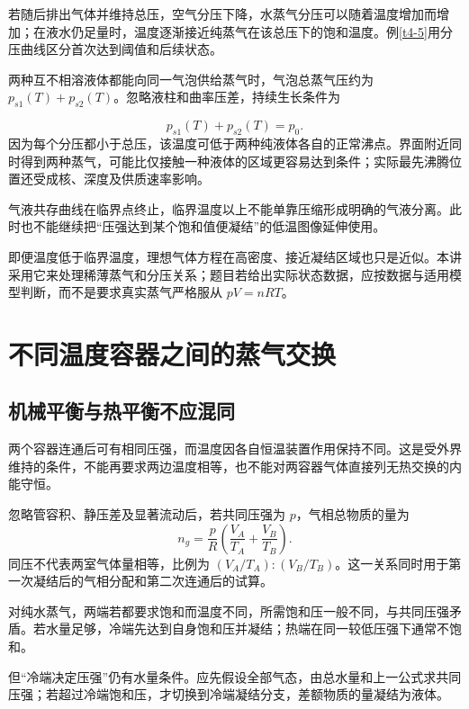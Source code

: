 若随后排出气体并维持总压，空气分压下降，水蒸气分压可以随着温度增加而增加；在液水仍足量时，温度逐渐接近纯蒸气在该总压下的饱和温度。例\ref{t4-5}用分压曲线区分首次达到阈值和后续状态。

两种互不相溶液体都能向同一气泡供给蒸气时，气泡总蒸气压约为 $p_{s1}(T)+p_{s2}(T)$。忽略液柱和曲率压差，持续生长条件为

\[p_{s1}(T)+p_{s2}(T)=p_0.
\]
因为每个分压都小于总压，该温度可低于两种纯液体各自的正常沸点。界面附近同时得到两种蒸气，可能比仅接触一种液体的区域更容易达到条件；实际最先沸腾位置还受成核、深度及供质速率影响。


气液共存曲线在临界点终止，临界温度以上不能单靠压缩形成明确的气液分离。此时也不能继续把“压强达到某个饱和值便凝结”的低温图像延伸使用。

即便温度低于临界温度，理想气体方程在高密度、接近凝结区域也只是近似。本讲采用它来处理稀薄蒸气和分压关系；题目若给出实际状态数据，应按数据与适用模型判断，而不是要求真实蒸气严格服从 $pV=nRT$。

\section{不同温度容器之间的蒸气交换}
\subsection{机械平衡与热平衡不应混同}
两个容器连通后可有相同压强，而温度因各自恒温装置作用保持不同。这是受外界维持的条件，不能再要求两边温度相等，也不能对两容器气体直接列无热交换的内能守恒。

忽略管容积、静压差及显著流动后，若共同压强为 $p$，气相总物质的量为
\[n_g=\frac pR\left(\frac{V_A}{T_A}+\frac{V_B}{T_B}\right).
\]
同压不代表两室气体量相等，比例为 $(V_A/T_A):(V_B/T_B)$。这一关系同时用于第一次凝结后的气相分配和第二次连通后的试算。


对纯水蒸气，两端若都要求饱和而温度不同，所需饱和压一般不同，与共同压强矛盾。若水量足够，冷端先达到自身饱和压并凝结；热端在同一较低压强下通常不饱和。

但“冷端决定压强”仍有水量条件。应先假设全部气态，由总水量和上一公式求共同压强；若超过冷端饱和压，才切换到冷端凝结分支，差额物质的量凝结为液体。


